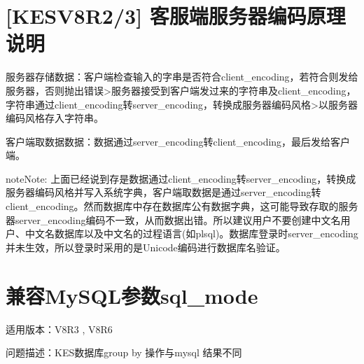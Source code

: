 \documentclass[letterpaper,10pt,english]{sphinxmanual}
\begin{document}
\begin{sphinxVerbatim}[commandchars=\\\{\}]
                                                                                      
                                                                                                      
        
  
\end{sphinxVerbatim}


\section{{[}KESV8R2/3{]} 客服端服务器编码原理说明}
\label{\detokenize{sql:kesv8r2-3}}
服务器存储数据：客户端检查输入的字串是否符合client\_encoding，若符合则发给服务器，否则抛出错误\sphinxhyphen{}\sphinxhyphen{}>服务器接受到客户端发过来的字符串及client\_encoding，字符串通过client\_encoding转server\_encoding，转换成服务器编码风格\sphinxhyphen{}\sphinxhyphen{}>以服务器编码风格存入字符串。

客户端取数据数据：数据通过server\_encoding转client\_encoding，最后发给客户端。

\begin{sphinxadmonition}{note}{Note:}
上面已经说到存是数据通过client\_encoding转server\_encoding，转换成服务器编码风格并写入系统字典，客户端取数据是通过server\_encoding转client\_encoding。然而数据库中存在数据库公有数据字典，这可能导致存取的服务器server\_encoding编码不一致，从而数据出错。所以建议用户不要创建中文名用户、中文名数据库以及中文名的过程语言(如plsql)。数据库登录时server\_encoding并未生效，所以登录时采用的是Unicode编码进行数据库名验证。
\end{sphinxadmonition}


\section{兼容MySQL参数sql\_mode}
\label{\detokenize{sql:mysqlsql-mode}}
适用版本：V8R3 , V8R6

问题描述：KES数据库group by 操作与mysql 结果不同
\end{document}
